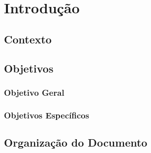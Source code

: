 \chapter*[Introdução]{Introdução}

\section{Contexto}
\section{Objetivos}
\subsection{Objetivo Geral}
\subsection{Objetivos Específicos}
\section{Organização do Documento}

